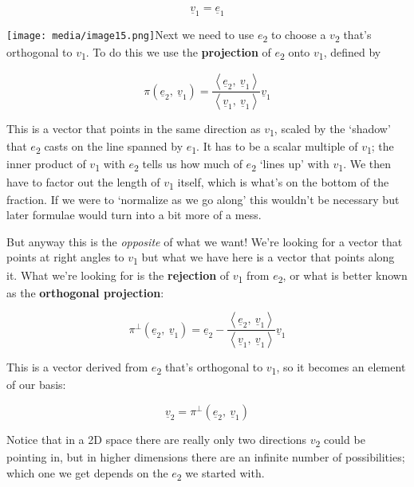 \documentclass[oneside,english]{amsbook}
\numberwithin{section}{chapter}
\theoremstyle{plain}
\theoremstyle{definition}
\begin{document}
\[{\underline{v}}_{1} = {\underline{e}}_{1}\]

\texttt{[image: media/image15.png]}Next
we need to use $e$\textsubscript{2} to choose a
$v$\textsubscript{2} that's orthogonal to $v$\textsubscript{1}. To
do this we use the \textbf{projection} of $e$\textsubscript{2} onto
$v$\textsubscript{1}, defined by

\[\pi({\underline{e}}_{2},\ {\underline{v}}_{1}) = \frac{\left\langle {\underline{e}}_{2},\ {\underline{v}}_{1} \right\rangle}{\left\langle {\underline{v}}_{1},\ {\underline{v}}_{1} \right\rangle}{\underline{v}}_{1}\]

This is a vector that points in the same direction as
$v$\textsubscript{1}, scaled by the `shadow' that
$e$\textsubscript{2} casts on the line spanned by
$e$\textsubscript{1}. It has to be a scalar multiple of
$v$\textsubscript{1}; the inner product of $v$\textsubscript{1}
with $e$\textsubscript{2} tells us how much of
$e$\textsubscript{2} `lines up' with $v$\textsubscript{1}. We
then have to factor out the length of $v$\textsubscript{1} itself,
which is what's on the bottom of the fraction. If we were to `normalize
as we go along' this wouldn't be necessary but later formulae would
turn into a bit more of a mess.

But anyway this is the \emph{opposite} of what we want! We're looking
for a vector that points at right angles to $v$\textsubscript{1} but
what we have here is a vector that points along it. What we're looking
for is the \textbf{rejection} of $v$\textsubscript{1} from
$e$\textsubscript{2}, or what is better known as the
\textbf{orthogonal projection}:

\[\pi^{\bot}({\underline{e}}_{2},\ {\underline{v}}_{1}) = {\underline{e}}_{2} - \frac{\left\langle {\underline{e}}_{2},\ {\underline{v}}_{1} \right\rangle}{\left\langle {\underline{v}}_{1},\ {\underline{v}}_{1} \right\rangle}{\underline{v}}_{1}\]

This is a vector derived from $e$\textsubscript{2} that's orthogonal
to $v$\textsubscript{1}, so it becomes an element of our basis:

\[{\underline{v}}_{2} = \pi^{\bot}({\underline{e}}_{2},\ {\underline{v}}_{1})\]

Notice that in a 2D space there are really only two directions
$v$\textsubscript{2} could be pointing in, but in higher dimensions
there are an infinite number of possibilities; which one we get depends
on the $e$\textsubscript{2} we started with.
\end{document}

